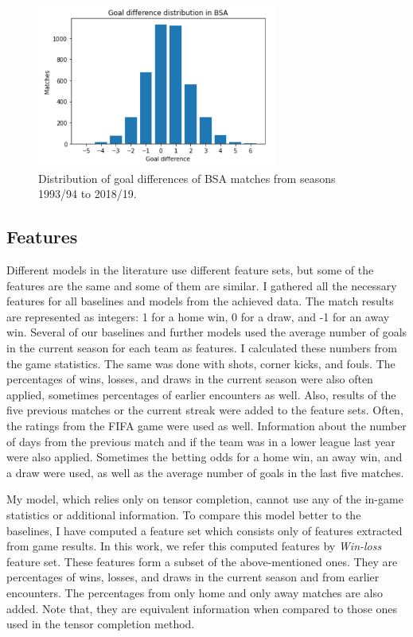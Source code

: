 \documentclass[thesis=M,english]{FITthesis}[2019/12/23]
\begin{document}
\begin{figure}[h]
    \centering
    \includegraphics[width=0.7\textwidth]{figures/bsa_gd.png}
    \caption{Distribution of goal differences of BSA matches from seasons 1993/94 to 2018/19.}
    \label{fig:bsa_gd}
\end{figure}
 


\subsection{Features}
Different models in the literature use different feature sets, but some of the features are the same and some of them are similar. I gathered all the necessary features for all baselines and models from the achieved data. The match results are represented as integers: 1 for a home win, 0 for a draw, and -1 for an away win. Several of our baselines and further models used the average number of goals in the current season for each team as features. I calculated these numbers from the game statistics. The same was done with shots, corner kicks, and fouls. The percentages of wins, losses, and draws in the current season were also often applied, sometimes percentages of earlier encounters as well. Also, results of the five previous matches or the current streak were added to the feature sets. Often, the ratings from the FIFA game were used as well. Information about the number of days from the previous match and if the team was in a lower league last year were also applied. Sometimes the betting odds for a home win, an away win, and a draw were used, as well as the average number of goals in the last five matches.

My model, which relies only on tensor completion, cannot use any of the in-game statistics or additional information. To compare this model better to the baselines, I have computed a feature set which consists only of features extracted from game results. In this work, we refer this computed features by  \textit{Win-loss} feature set. These features form a subset of the above-mentioned ones. They are percentages of wins, losses, and draws in the current season and from earlier encounters. The percentages from only home and only away matches are also added. Note that, they are equivalent information when compared to those ones used in the tensor completion method.
\end{document}
